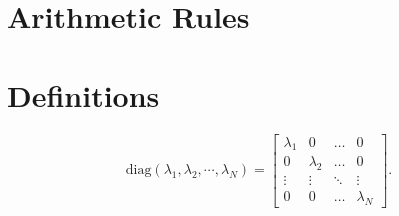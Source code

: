 \section*{Arithmetic Rules}

\section*{Definitions}
\begin{equation}
    \text{diag}(\lambda_1, \lambda_2, \cdots, \lambda_N)=
    \begin{bmatrix}
    \lambda_1 &     0     & \dots  & 0 \\
       0      & \lambda_2 & \dots  & 0 \\
       \vdots &     \vdots     & \ddots & \vdots\\
    0         &     0     & \dots  &  \lambda_N
\end{bmatrix}.    
\end{equation}